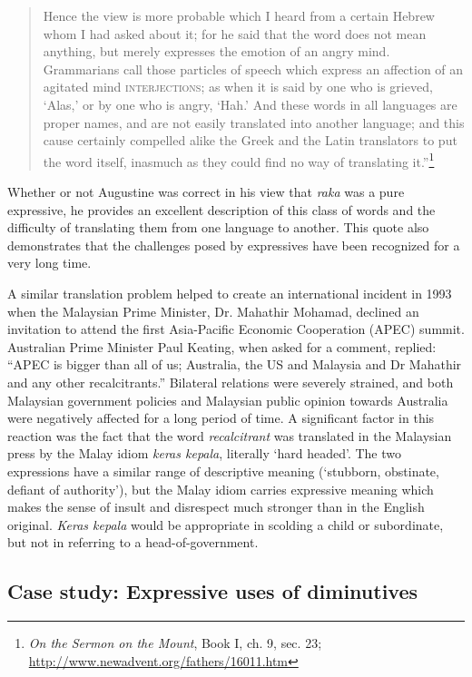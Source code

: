 \begin{quote}
Hence the view is more probable which I heard from a certain Hebrew whom I had asked about it; for he said that the word does not mean anything, but merely expresses the emotion of an angry mind. Grammarians call those particles of speech which express an affection of an agitated mind \textsc{interjections}; as when it is said by one who is grieved, ‘Alas,’ or by one who is angry, ‘Hah.’ And these words in all languages are proper names, and are not easily translated into another language; and this cause certainly compelled alike the Greek and the Latin translators to put the word itself, inasmuch as they could find no way of translating it.”\footnote{\textit{On the Sermon on the Mount}, Book I, ch. 9, sec. 23; \url{http://www.newadvent.org/fathers/16011.htm}} 
\end{quote}


Whether or not Augustine was correct in his view that \textit{raka} was a pure expressive, he provides an excellent description of this class of words and the difficulty of translating them from one language to another. This quote also demonstrates that the challenges posed by expressives have been recognized for a very long time.



A similar translation problem helped to create an international incident in 1993 when the Malaysian Prime Minister, Dr. Mahathir Mohamad, declined an invitation to attend the first Asia-Pacific Economic Cooperation (APEC) summit. Australian Prime Minister Paul Keating, when asked for a comment, replied: “APEC is bigger than all of us; Australia, the US and Malaysia and Dr Mahathir and any other recalcitrants.” Bilateral relations were severely strained, and both Malaysian government policies and Malaysian public opinion towards Australia were negatively affected for a long period of time. A significant factor in this reaction was the fact that the word \textit{recalcitrant} was translated in the Malaysian press by the Malay idiom \textit{keras kepala}, literally ‘hard headed’. The two expressions have a similar range of descriptive meaning (‘stubborn, obstinate, defiant of authority’), but the Malay idiom carries expressive meaning which makes the sense of insult and disrespect much stronger than in the English original. \textit{Keras kepala} would be appropriate in scolding a child or subordinate, but not in referring to a head-of-government.


\subsection{Case study: Expressive uses of diminutives}\label{sec:} %

